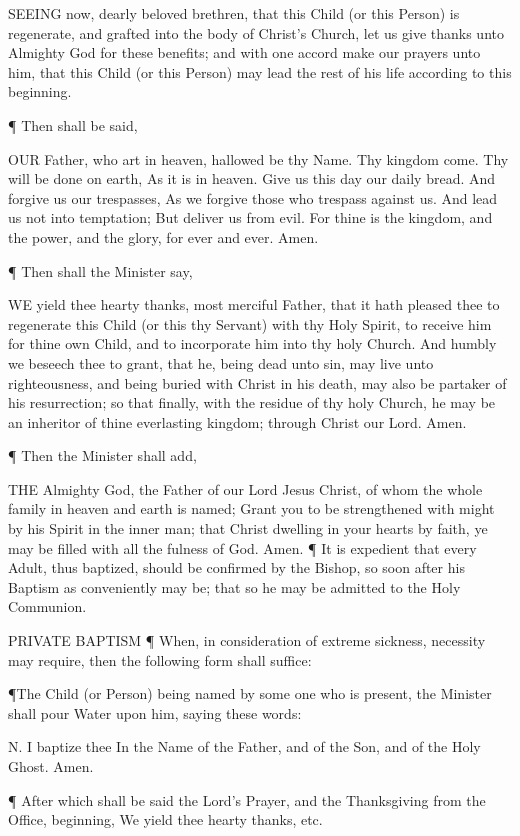 SEEING now, dearly beloved brethren, that this Child (or this Person) is regenerate, and grafted into the body of Christ’s Church, let us give thanks unto Almighty God for these benefits; and with one accord make our prayers unto him, that this Child (or this Person) may lead the rest of his life according to this beginning.

¶ Then shall be said,

OUR Father, who art in heaven, hallowed be thy Name. Thy kingdom come. Thy will be done on earth, As it is in heaven. Give us this day our daily bread. And forgive us our trespasses, As we forgive those who trespass against us. And lead us not into temptation; But deliver us from evil. For thine is the kingdom, and the power, and the glory, for ever and ever. Amen.

¶ Then shall the Minister say,

WE yield thee hearty thanks, most merciful Father, that it hath pleased thee to regenerate this Child (or this thy Servant) with thy Holy Spirit, to receive him for thine own Child, and to incorporate him into thy holy Church. And humbly we beseech thee to grant, that he, being dead unto sin, may live unto righteousness, and being buried with Christ in his death, may also be partaker of his resurrection; so that finally, with the residue of thy holy Church, he may be an inheritor of thine everlasting kingdom; through Christ our Lord. Amen.

 
¶ Then the Minister shall add, 
 
THE Almighty God, the Father of our Lord Jesus Christ, of whom the whole family in heaven and earth is named; Grant you to be strengthened with might by his Spirit in the inner man; that Christ dwelling in your hearts by faith, ye may be filled with all the fulness of God. Amen.
¶ It is expedient that every Adult, thus baptized, should be confirmed by the Bishop, so soon after his Baptism as conveniently may be; that so he may be admitted to the Holy Communion.

 

 
PRIVATE BAPTISM
¶ When, in consideration of extreme sickness, necessity may require, then the following form shall suffice:

¶The Child (or Person) being named by some one who is present, the Minister shall pour Water upon him, saying these words:

N. I baptize thee In the Name of the Father, and of the Son, and of the Holy Ghost. Amen.

¶ After which shall be said the Lord’s Prayer, and the Thanksgiving from the Office, beginning, We yield thee hearty thanks, etc.


